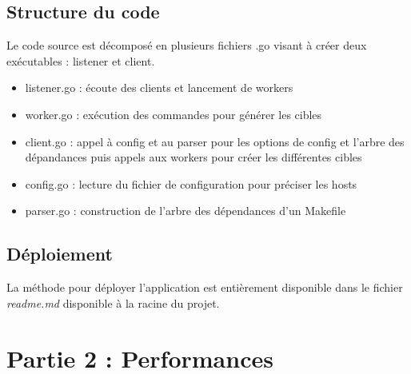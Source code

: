 \documentclass[a4paper,11pt]{article}
\begin{document}
\subsection{Structure du code}
Le code source est décomposé en plusieurs fichiers .go visant à créer deux exécutables : listener et client.
\begin{itemize}
\item listener.go : écoute des clients et lancement de workers
\item worker.go : exécution des commandes pour générer les cibles
\item client.go : appel à config et au parser pour les options de config et l'arbre des dépandances puis appels aux workers pour créer les différentes cibles
\item config.go : lecture du fichier de configuration pour préciser les hosts
\item parser.go : construction de l'arbre des dépendances d'un Makefile
\end{itemize}

\subsection{Déploiement}
La méthode pour déployer l'application est entièrement disponible dans le fichier \textit{readme.md} disponible à la racine du projet.

\section{Partie 2 : Performances}
\end{document}
